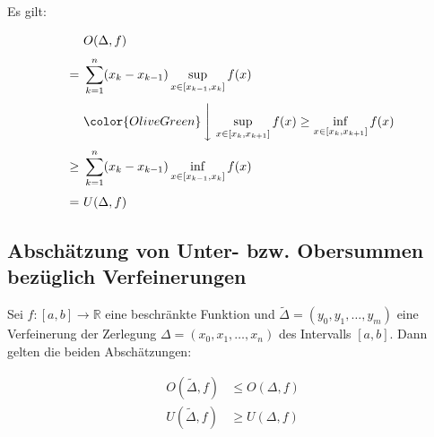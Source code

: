 \documentclass[fontsize=9pt,
               parskip=half-,
               DIV=14,
               listof=chapterentry,
               tocflat]{scrbook}
\begin{document}
\begin{proof*}
Es gilt:

\begin{align*}
&O(\Delta ,f)\\[0.3em]=\ &\sum _{k=1}^{n}(x_{k}-x_{k-1})\sup _{x\in [x_{k-1},x_{k}]}f(x)\\[0.3em]&{\color {OliveGreen}\left\downarrow \ \sup _{x\in [x_{k},x_{k+1}]}f(x)\geq \inf _{x\in [x_{k},x_{k+1}]}f(x)\right.}\\[0.3em]\geq \ &\sum _{k=1}^{n}(x_{k}-x_{k-1})\inf _{x\in [x_{k-1},x_{k}]}f(x)\\[0.3em]=\ &U(\Delta ,f)
\end{align*}

\end{proof*}

\subsection{Abschätzung von Unter- bzw. Obersummen bezüglich Verfeinerungen}

\begin{theorem*}
Sei $f:[a,b]\to \mathbb {R} $ eine beschränkte Funktion und ${\tilde {\Delta }}=(y_{0},y_{1},\ldots ,y_{m})$ eine Verfeinerung der Zerlegung $\Delta =(x_{0},x_{1},\ldots ,x_{n})$ des Intervalls $[a,b]$. Dann gelten die beiden Abschätzungen:

\begin{align*}
O({\tilde {\Delta }},f)&\leq O(\Delta ,f)\\[0.3em]U({\tilde {\Delta }},f)&\geq U(\Delta ,f)
\end{align*}

\end{theorem*}
\end{document}

